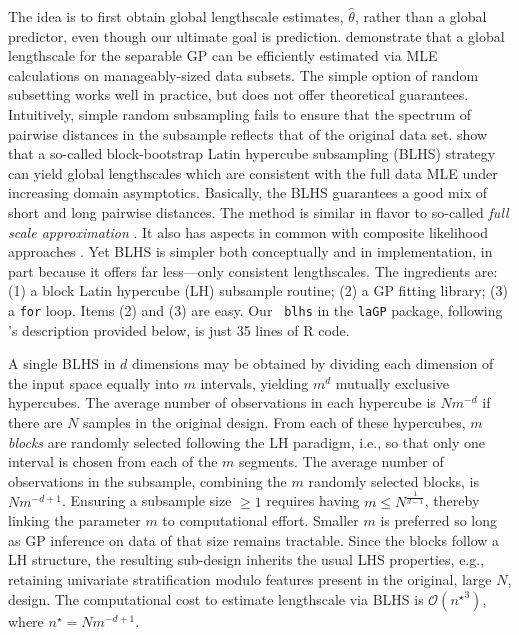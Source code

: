\documentclass[12pt]{article}
\begin{document}
The idea is to first obtain global lengthscale estimates, $\hat{\theta}$,
rather than a global predictor, even though our ultimate goal is prediction.
\citet{liu:hung:2015} demonstrate that a global lengthscale for the separable
GP can be efficiently estimated via MLE calculations on manageably-sized data
subsets. The simple option of random subsetting works well in practice, but
does not offer theoretical guarantees. Intuitively, simple random subsampling
fails to ensure that the spectrum of pairwise distances in the subsample
reflects that of the original data set. \citeauthor{liu:hung:2015} show that a
so-called block-bootstrap Latin hypercube subsampling (BLHS) strategy can
yield global lengthscales which are consistent with the full data
MLE under increasing domain asymptotics. Basically, the BLHS guarantees a good mix of short and long
pairwise distances. The method is similar in flavor to so-called {\em
full scale approximation} \citep{sang:huang:2012,zhang:etal:2015}.  It also
has aspects in common with composite likelihood approaches
\citep{varin:etal:2011,gu:berger:2016}.  Yet BLHS is simpler both conceptually
and in implementation, in part because it offers far less---only consistent
lengthscales.  The ingredients are: (1) a block Latin hypercube (LH) subsample routine; (2) a GP
fitting library; (3) a {\tt for} loop.  Items (2) and (3) are easy.  Our {\tt
blhs} in the {\tt laGP} package, following \citeauthor{liu:hung:2015}'s
description provided below, is just 35 lines of {\sf R} code.

A single BLHS in $d$ dimensions may be obtained by dividing
each dimension of the input space equally into $m$ intervals, yielding $m^d$
mutually exclusive hypercubes.  The average number of observations in each
hypercube is $Nm^{-d}$ if there are $N$ samples in the original design. From
each of these hypercubes, $m$ {\em blocks} are randomly selected following the
LH paradigm, i.e., so that only one interval is chosen from each of the $m$
segments. The average number of observations in the subsample, combining the
$m$ randomly selected blocks, is $Nm^{-d+1}$. Ensuring a subsample size $\geq
1$ requires having $m\leq N^{\frac{1}{d-1}}$, thereby linking the parameter
$m$ to computational effort.  Smaller $m$ is preferred so long as GP inference
on data of that size remains tractable.  Since the blocks follow a LH
structure, the resulting sub-design inherits the usual LHS properties, e.g.,
retaining univariate stratification modulo features present in the original,
large $N$, design. The computational cost to estimate lengthscale via
BLHS is $\mathcal{O}({n^{\star}}^3)$, where $n^{\star}=Nm^{-d+1}$.
\end{document}
